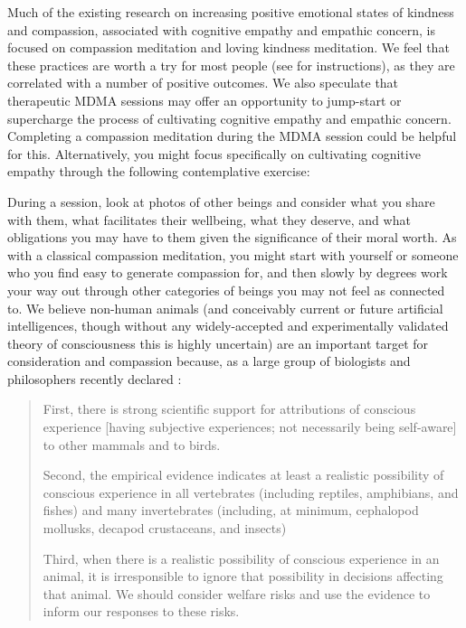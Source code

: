 \documentclass[12pt,letterpaper]{book}
\begin{document}
Much of the existing research on increasing positive emotional states of kindness and compassion, associated with cognitive empathy and empathic concern, is focused on compassion meditation and loving kindness meditation. We feel that these practices are worth a try for most people (see \textcite{lkMeditation} for instructions), as they are correlated with a number of positive outcomes. We also speculate that therapeutic MDMA sessions may offer an opportunity to jump-start or supercharge the process of cultivating cognitive empathy and empathic concern. Completing a compassion meditation during the MDMA session could be helpful for this. Alternatively, you might focus specifically on cultivating cognitive empathy through the following contemplative exercise:

During a session, look at photos of other beings and consider what you share with them, what facilitates their wellbeing, what they deserve, and what obligations you may have to them given the significance of their moral worth. As with a classical compassion meditation, you might start with yourself or someone who you find easy to generate compassion for, and then slowly by degrees work your way out through other categories of beings you may not feel as connected to. We believe non-human animals (and conceivably current or future artificial intelligences, though without any widely-accepted and experimentally validated theory of consciousness this is highly uncertain) are an important target for consideration and compassion because, as a large group of biologists and philosophers recently declared \cite{newYorkAnimal}:

\begin{quotation}
    First, there is strong scientific support for attributions of conscious experience [having subjective experiences; not necessarily being self-aware] to other mammals and to birds.
    
    Second, the empirical evidence indicates at least a realistic possibility of conscious experience in all vertebrates (including reptiles, amphibians, and fishes) and many invertebrates (including, at minimum, cephalopod mollusks, decapod crustaceans, and insects)

    Third, when there is a realistic possibility of conscious experience in an animal, it is irresponsible to ignore that possibility in decisions affecting that animal. We should consider welfare risks and use the evidence to inform our responses to these risks.
\end{quotation}
\end{document}
